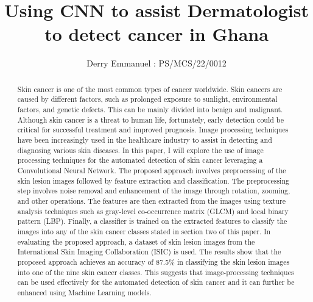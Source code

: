 \documentclass{article}
\title{Using CNN to assist Dermatologist to detect cancer in Ghana}
\author{Derry Emmanuel : PS/MCS/22/0012}
\date{}
\begin{document}
\maketitle

\begin{abstract}
Skin cancer is one of the most common types of cancer worldwide.  Skin cancers are caused by different factors, such as prolonged exposure to sunlight, environmental factors, and genetic defects. This can be mainly divided into benign and malignant. Although skin cancer is a threat to human life, fortunately, early detection could be critical for successful treatment and improved prognosis. Image processing techniques have been increasingly used in the healthcare industry to assist in detecting and diagnosing various skin diseases. In this paper, I will explore the use of image processing techniques for the automated detection of skin cancer leveraging a Convolutional Neural Network. The proposed approach involves preprocessing of the skin lesion images followed by feature extraction and classification. The preprocessing step involves noise removal and enhancement of the image through rotation, zooming, and other operations.  The features are then extracted from the images using texture analysis techniques such as gray-level co-occurrence matrix (GLCM) and local binary pattern (LBP). Finally, a classifier is trained on the extracted features to classify the images into any of the skin cancer classes stated in section two of this paper. In evaluating the proposed approach, a dataset of skin lesion images from the International Skin Imaging Collaboration (ISIC) is used. The results show that the proposed approach achieves an accuracy of 87.5\% in classifying the skin lesion images into one of the nine skin cancer classes. This suggests that image-processing techniques can be used effectively for the automated detection of skin cancer and it can further be enhanced using Machine Learning models.
\end{abstract}
\end{document}
